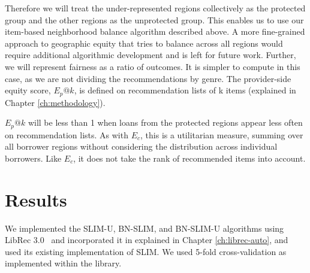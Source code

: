 
Therefore we will treat the under-represented regions collectively as the protected group and the other regions as the unprotected group. This enables us to use our item-based neighborhood balance algorithm described above. A more fine-grained approach to geographic equity that tries to balance across all regions would require additional algorithmic development and is left for future work. Further, we will represent fairness as a ratio of outcomes. It is simpler to compute in this case, as we are not dividing the recommendations by genre. The provider-side equity score, $E_p@k$, is defined on recommendation lists of k items (explained in Chapter \ref{ch:methodology}). 




$E_p@k$ will be less than 1 when loans from the protected regions appear less often on recommendation lists. As with $E_c$, this is a utilitarian measure, summing over all borrower regions without considering the distribution across individual borrowers. Like $E_c$, it does not take the rank of recommended items into account.


\section{Results}

We implemented the SLIM-U, BN-SLIM, and BN-SLIM-U algorithms using LibRec 3.0~\cite{guo2015librec} and incorporated it in \libauto{} explained in Chapter \ref{ch:librec-auto}, and used its existing implementation of SLIM. We used 5-fold cross-validation as implemented within the library.

